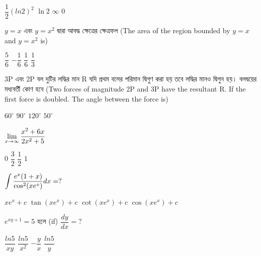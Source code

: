 \documentclass[addpoints]{exam}
\begin{document}
\begin{questions}
\begin{oneparchoices}
\choice $ \dfrac{1}{2}(ln2)^{2} $
\choice $ \ln 2 $
\choice $ \infty $
\choice  $ 0 $
\end{oneparchoices}

\question $ y = x $ এবং $ y=x^2 $ দ্বারা আবদ্ধ ক্ষেত্রের ক্ষেত্রফল (The area of the region bounded by $ y = x $ and $ y = x^2 $ is)

\begin{oneparchoices}
\choice $ \dfrac{5}{6}$
\choice $  -\dfrac{1}{6} $
\choice $  \dfrac{1}{6} $
\choice  $  \dfrac{1}{3}$
\end{oneparchoices}

\question  3P এবং 2P বল দুটির লদ্ধির মান R যদি প্রথম বলের পরিমান দ্বিগুণ করা হয় তবে লদ্ধির মানও দ্বিগুন হয়। বলদ্বয়ের মধ্যবর্তী কোণ হবে (Two forces of magnitude 2P and 3P have the resultant R. If the first force is doubled. The angle between the force is)

\begin{oneparchoices}
\choice $ 60^{\circ} $
\choice $ 90^{\circ} $
\choice $ 120^{\circ} $
\choice  $ 50^{\circ} $
\end{oneparchoices}

\question  $ \mathlarger{\lim_{x\to\infty} \dfrac{x^{2}+6x}{2x^{2}+5}} $

\begin{oneparchoices}
\choice $ 0 $
\choice $ \dfrac{3}{2} $
\choice $ \dfrac{1}{2} $
\choice  $ 1 $

\end{oneparchoices}

\question   $\mathlarger{\int \dfrac{e^{x}(1+x)}{\cos^{2}(xe^{x})}dx =?}$


\begin{oneparchoices}
\choice $ xe^{x} + c $
\choice $ \tan (xe^{x}) + c $
\choice $ \cot(xe^{x}) + c $
\choice $ \cos(xe^{x}) + c $

\end{oneparchoices}

\question  $ e^{xy + 1} =5 $ হলে (if) $ \dfrac{dy}{dx} = ? $

\begin{oneparchoices}
\choice $ \dfrac{ln 5}{xy} $
\choice $ \dfrac{ln 5}{x^{2}} $
\choice $ -\dfrac{y}{x} $
\choice $ \dfrac{ln 5}{y} $

\end{oneparchoices}

\end{questions}
\end{document}

